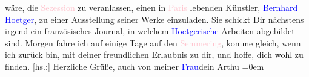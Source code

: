                wäre, die \textcolor{pink}{Sezession}{}\ledrightnote{\textcolor{pink}{Secession}} zu veranlassen, einen in \textcolor{pink}{Paris}{}\ledrightnote{\textcolor{pink}{Paris}} lebenden Künstler, \textcolor{blue}{Bernhard Hoetger}{}\ledrightnote{\textcolor{blue}{Bernhard Hoetger}}, zu einer Ausstellung seiner Werke einzuladen.
               Sie schickt Dir nächstens irgend ein französisches Journal, in welchem \textcolor{blue}{Hoetgerische}{}\ledrightnote{\textcolor{blue}{Bernhard Hoetger}} Arbeiten abgebildet sind.\pend
           \pstart
           Morgen fahre ich auf einige Tage auf den \textcolor{pink}{Semmering}{}\ledrightnote{\textcolor{pink}{Semmering}},
               komme gleich, wenn ich zurück bin, mit deiner freundlichen Erlaubnis zu dir, und
               hoffe, dich wohl zu finden.\pend
           \pstart
           {[}hs.:{]} Herzliche Grüße, auch von meiner \textcolor{blue}{Frau}{}dein \spacefill\mbox{Arthu}\pend
           \leftskip=0em{}\endnumbering{}  
      